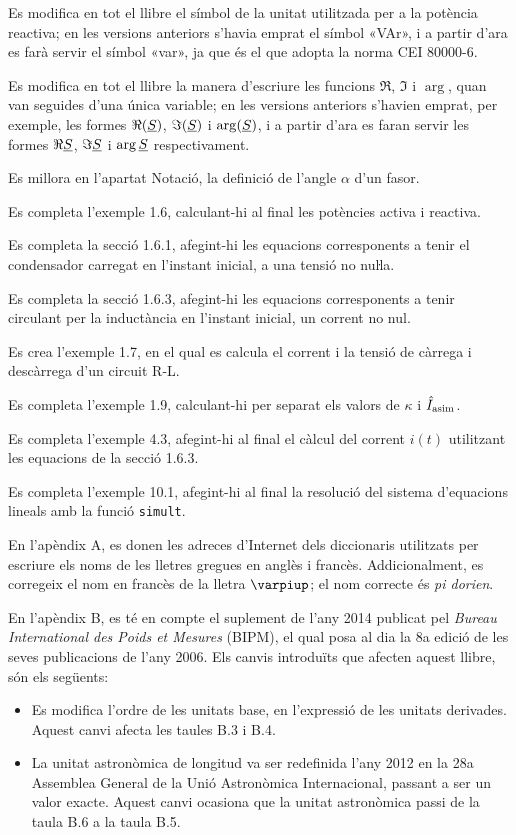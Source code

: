 Es modifica en tot el llibre el símbol de la unitat  utilitzada per a la potència reactiva; en les versions anteriors s'havia emprat el símbol «VAr», i a partir d'ara es farà servir el símbol «var», ja que és el que adopta la norma CEI 80000-6.

Es modifica en tot el llibre la manera d'escriure les funcions $\Re$, $\Im$ i $\arg$, quan van seguides d'una única variable; en les versions anteriors s'havien emprat, per exemple, les formes $\Re(\underline{S})$, $\Im(\underline{S})$ i $\arg(\underline{S})$, i a partir d'ara es faran servir les formes $\Re\underline{S}$, $\Im\underline{S}$ i $\arg\underline{S}$ respectivament.


Es millora en l’apartat Notació, la definició de l’angle $\alpha$ d’un fasor.


Es completa l'exemple 1.6, calculant-hi al final les potències activa i reactiva.

Es completa la secció 1.6.1, afegint-hi les equacions corresponents a tenir el condensador carregat en l'instant inicial, a una tensió no nuŀla.

Es completa la secció 1.6.3, afegint-hi les equacions corresponents a tenir circulant per la inductància en l'instant  inicial, un corrent no nul.

Es crea l'exemple 1.7, en el qual es calcula el corrent i la tensió de càrrega i descàrrega d'un circuit R-L.

Es completa l'exemple 1.9, calculant-hi per separat els valors de $\kappa$ i $\hat{I}_\mathrm{asim}$.


Es completa l'exemple 4.3, afegint-hi al final el càlcul del corrent $i(t)$ utilitzant les equacions de la secció 1.6.3.

Es completa l'exemple 10.1, afegint-hi al final la resolució del sistema d'equacions lineals amb la funció \texttt{simult}.


En l'apèndix A, es donen les adreces d'Internet dels diccionaris utilitzats per escriure els noms de les lletres gregues en anglès i francès. Addicionalment, es corregeix el nom en francès de la lletra $\varpiup$; el nom correcte és \textit{pi dorien}.

En l'apèndix B, es té en compte el suplement de l'any 2014 publicat pel  \textit{Bureau International des Poids et Mesures} (BIPM), el qual posa al dia la 8a edició de les seves publicacions de l'any 2006. Els canvis introduïts que afecten aquest llibre, són els següents:
\begin{itemize}
  \item Es modifica l'ordre de les unitats base, en l'expressió de les unitats derivades. Aquest canvi afecta les taules B.3 i B.4.
  \item La unitat astronòmica de longitud va ser redefinida l'any 2012 en la 28a Assemblea General de la Unió Astronòmica Internacional, passant a ser un valor exacte. Aquest canvi ocasiona que la unitat astronòmica passi de la taula B.6  a la taula  B.5.
\end{itemize}

